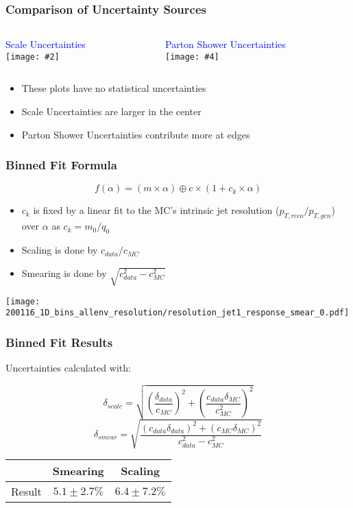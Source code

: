 \documentclass{beamer}
\newcommand{\twofigs}[4]{
  \begin{columns}
    \begin{column}{0.5\linewidth}
      \centering
      \textcolor{blue}{#1} \\
      \texttt{[image: \#2]}
    \end{column}
    \begin{column}{0.5\linewidth}
      \centering
      \textcolor{blue}{#3} \\
      \texttt{[image: \#4]}
    \end{column}
  \end{columns}
}
\begin{document}
\begin{frame}
  \frametitle{Comparison of Uncertainty Sources}

  \vspace{8pt}

  \twofigs{Scale Uncertainties}
          {200116_1D_bins_scaleenv/smearplot_2_jet1_response.pdf}
          {Parton Shower Uncertainties}
          {200116_1D_bins_psenv/smearplot_2_jet1_response.pdf}

  \begin{itemize}
  \item These plots have no statistical uncertainties
  \item Scale Uncertainties are larger in the center
  \item Parton Shower Uncertainties contribute more at edges
  \end{itemize}

\end{frame}


\begin{frame}
  \frametitle{Binned Fit Formula}

  \[
  f(\alpha) = (m \times \alpha) \oplus c \times (1 + c_k \times \alpha)
  \]

  \begin{itemize}
  \item $c_k$ is fixed by a linear fit to the MC's intrinsic jet resolution ($p_{T, reco}/p_{T, gen}$) over $\alpha$ as $c_k = m_0/q_0$
  \item Scaling is done by $c_{data}/c_{MC}$
  \item Smearing is done by $\sqrt{c_{data}^2 - c_{MC}^2}$
  \end{itemize}

  \centering
  \texttt{[image: 200116\_1D\_bins\_allenv\_resolution/resolution\_jet1\_response\_smear\_0.pdf]}

\end{frame}


\begin{frame}
  \frametitle{Binned Fit Results}

  Uncertainties calculated with:

  \[
  \delta_{scale} = \sqrt{\left(\frac{\delta_{data}}{c_{MC}}\right)^2 +
    \left(\frac{c_{data}\delta_{MC}}{c_{MC}^2}\right)^2}
  \]
  \[
  \delta_{smear} = \sqrt{\frac{(c_{data}\delta_{data})^2 +
      (c_{MC}\delta_{MC})^2}{c_{data}^2 - c_{MC}^2}}
  \]

  \vfill
  \centering
  \begin{tabular}{l|c|c|}
    & Smearing & Scaling \\
    \hline
    Result & $5.1 \pm 2.7 \%$ & $6.4 \pm 7.2 \%$ \\
    \hline
  \end{tabular}

\end{frame}
\end{document}
